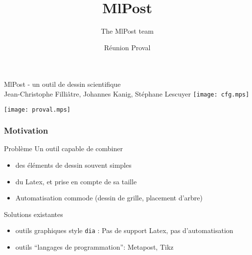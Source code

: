 \documentclass[nodefaultblocks]{beamer}
\title{MlPost}
\author{The MlPost team}
\institute{Proval}
\date{Réunion Proval}
\begin{document}
\begin{frame}
  
  \begin{center}
    {\huge{MlPost - un outil de dessin scientifique}}\\[2em]
    {\large \alert{Jean-Christophe Filli\^atre, Johannes Kanig, St\'ephane Lescuyer}}
    \medskip
    \hfill\texttt{[image: cfg.mps]}
  \end{center}
  \hfill\texttt{[image: proval.mps]}
\end{frame}

\begin{frame}\frametitle{Motivation}

  \begin{block}{Problème}
    Un outil capable de combiner
    \begin{itemize}
      \item des éléments de dessin souvent simples
      \item du Latex, et prise en compte de sa taille
      \item Automatisation commode (dessin de grille, placement d'arbre)
    \end{itemize}
  \end{block}

  \begin{block}{Solutions existantes}
    \begin{itemize}
      \item outils graphiques style {\tt dia} : Pas de support Latex, pas
        d'automatisation
      \item outils ``langages de programmation'': Metapost, Tikz
    \end{itemize}
  \end{block}
\end{frame}
\end{document}

